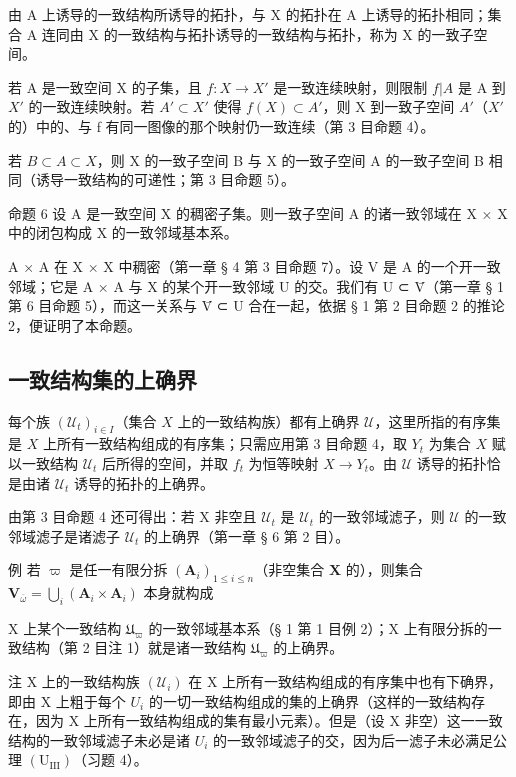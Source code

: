 由 A 上诱导的一致结构所诱导的拓扑，与 X 的拓扑在 A 上诱导的拓扑相同；集合 A 连同由 X 的一致结构与拓扑诱导的一致结构与拓扑，称为 X 的一致子空间。

若 A 是一致空间 X 的子集，且 \(f: X \to X'\) 是一致连续映射，则限制 \(f|A\) 是 A 到 \(X'\) 的一致连续映射。若 \(A' \subset X'\) 使得 \(f(X) \subset A'\)，则 X 到一致子空间 \(A'\)（\(X'\) 的）中的、与 f 有同一图像的那个映射仍一致连续（第 3 目命题 4）。

若 \(B \subset A \subset X\)，则 X 的一致子空间 B 与 X 的一致子空间 A 的一致子空间 B 相同（诱导一致结构的可递性；第 3 目命题 5）。

命题 6 设 A 是一致空间 X 的稠密子集。则一致子空间 A 的诸一致邻域在 X × X 中的闭包构成 X 的一致邻域基本系。

A × A 在 X × X 中稠密（第一章 § 4 第 3 目命题 7）。设 V 是 A 的一个开一致邻域；它是 A × A 与 X 的某个开一致邻域 U 的交。我们有 U ⊂ V̄（第一章 § 1 第 6 目命题 5），而这一关系与 V̄ ⊂ U 合在一起，依据 § 1 第 2 目命题 2 的推论 2，便证明了本命题。

\subsection{一致结构集的上确界}

每个族 \((\mathcal{U}_t)_{i\in I}\)（集合 \(X\) 上的一致结构族）都有上确界 \(\mathcal{U}\)，这里所指的有序集是 \(X\) 上所有一致结构组成的有序集；只需应用第 3 目命题 4，取 \(Y_t\) 为集合 \(X\) 赋以一致结构 \(\mathcal{U}_t\) 后所得的空间，并取 \(f_t\) 为恒等映射 \(X\to Y_t\)。由 \(\mathcal{U}\) 诱导的拓扑恰是由诸 \(\mathcal{U}_t\) 诱导的拓扑的上确界。

由第 3 目命题 4 还可得出：若 X 非空且 \(\mathcal{U}_{t}\) 是 \(\mathcal{U}_{t}\) 的一致邻域滤子，则 \(\mathcal{U}\) 的一致邻域滤子是诸滤子 \(\mathcal{U}_{t}\) 的上确界（第一章 § 6 第 2 目）。

例 若 \(\varpi\) 是任一有限分拆 \((\mathbf{A}_i)_{1 \leqslant i \leqslant n}\)（非空集合 \(\mathbf{X}\) 的），则集合 \(\mathbf{V}_{\overline{\omega}} = \bigcup_{i} (\mathbf{A}_i \times \mathbf{A}_i)\) 本身就构成

X 上某个一致结构 \(\mathfrak{U}_{\varpi}\) 的一致邻域基本系（§ 1 第 1 目例 2）；X 上有限分拆的一致结构（第 2 目注 1）就是诸一致结构 \(\mathfrak{U}_{\varpi}\) 的上确界。

注 X 上的一致结构族 \((\mathcal{U}_{i})\) 在 X 上所有一致结构组成的有序集中也有下确界，即由 X 上粗于每个 \(U_{i}\) 的一切一致结构组成的集的上确界（这样的一致结构存在，因为 X 上所有一致结构组成的集有最小元素）。但是（设 X 非空）这一一致结构的一致邻域滤子未必是诸 \(U_{i}\) 的一致邻域滤子的交，因为后一滤子未必满足公理 \((\mathrm{U}_{\mathrm{III}})\)（习题 4）。

